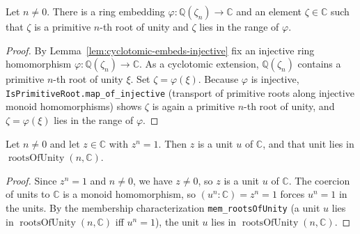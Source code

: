 \begin{lemma}
    \label{lem:embedding-primitive-root}
    \leanok
    Let $n \neq 0$. There is a ring embedding
    $\varphi : \mathbb{Q}(\zeta_n) \to \mathbb{C}$ and an element
    $\zeta \in \mathbb{C}$ such that $\zeta$ is a primitive $n$-th root of unity
    and $\zeta$ lies in the range of $\varphi$.
\end{lemma}
\begin{proof}
    By Lemma~\ref{lem:cyclotomic-embeds-injective} fix an injective ring
    homomorphism $\varphi : \mathbb{Q}(\zeta_n) \to \mathbb{C}$. As a cyclotomic
    extension, $\mathbb{Q}(\zeta_n)$ contains a primitive $n$-th root of unity
    $\xi$. Set $\zeta = \varphi(\xi)$. Because $\varphi$ is injective,
    \texttt{IsPrimitiveRoot.map\_of\_injective} (transport of primitive roots
    along injective monoid homomorphisms) shows $\zeta$ is again a primitive
    $n$-th root of unity, and $\zeta = \varphi(\xi)$ lies in the range of
    $\varphi$.
\end{proof}

\begin{lemma}
    \label{lem:mem-rootsOfUnity-of-pow-eq-one}
    \leanok
    Let $n \neq 0$ and let $z \in \mathbb{C}$ with $z^n = 1$. Then $z$ is a unit
    $u$ of $\mathbb{C}$, and that unit lies in
    $\operatorname{rootsOfUnity}(n, \mathbb{C})$.
\end{lemma}
\begin{proof}
    Since $z^n = 1$ and $n \neq 0$, we have $z \neq 0$, so $z$ is a unit $u$ of
    $\mathbb{C}$. The coercion of units to $\mathbb{C}$ is a monoid homomorphism,
    so $(u^n : \mathbb{C}) = z^n = 1$ forces $u^n = 1$ in the units. By the
    membership characterization \texttt{mem\_rootsOfUnity} (a unit $u$ lies in
    $\operatorname{rootsOfUnity}(n, \mathbb{C})$ iff $u^n = 1$), the unit $u$ lies
    in $\operatorname{rootsOfUnity}(n, \mathbb{C})$.
\end{proof}

